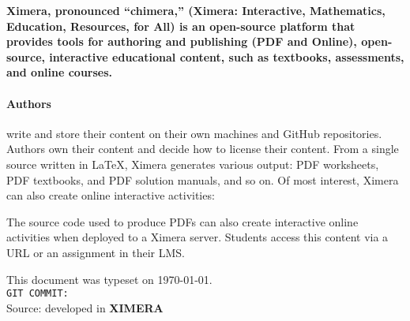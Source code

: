 \documentclass{ximera}
\begin{document}
  \pagestyle{empty}
  \pagecolor{bkgndcr}
  \boldmath %
  \bfseries %
  \color{txtcr}
  \sffamily\flushleft%
  Ximera, pronounced ``chimera,'' (\textbf{X}imera: \textbf{I}nteractive,
  \textbf{M}athematics, \textbf{E}ducation,
  \textbf{R}esources, for \textbf{A}ll) is an open-source platform that provides
  tools for
  authoring and publishing (PDF and Online), open-source, interactive educational
  content, such as textbooks, assessments, and online courses.
  
  \paragraph{Authors}  write and store their content on their own
  machines and GitHub repositories.
  Authors own their content and decide how to license their content. From a
  single source written in \LaTeX, Ximera generates various output: PDF
  worksheets,
  PDF textbooks, and	PDF solution manuals, and so on. Of most interest,
  Ximera can
  also create online interactive activities:
  \begin{center}
  \end{center}
  The source code used to produce PDFs can also create interactive online
  activities when deployed to a Ximera server. Students access this content via a
  URL or an assignment in their LMS.
  
\vfill

  \small This document was typeset on \today. \hfill \Large\textsf{\ccbyncsa}\\
  \small\texttt{GIT COMMIT: }\\
  \small Source: {\hypersetup{allcolors=txtcr}\docURL}\hfill developed in \textbf{XIMERA}
\end{document}
